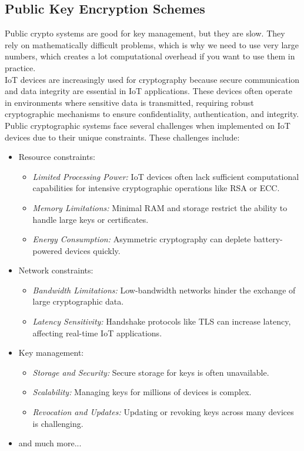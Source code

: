  \subsection{Public Key Encryption Schemes}
Public crypto systems are good for key management, but they are slow.
They rely on mathematically difficult problems, which is why we need to use very
large numbers, which creates a lot computational overhead if you want to use them in practice. \\

IoT devices are increasingly used for cryptography because secure communication and data integrity 
are essential in IoT applications.
These devices often operate in environments where sensitive data is transmitted, requiring robust cryptographic mechanisms to ensure confidentiality, authentication, and integrity.
Public cryptographic systems face several challenges when implemented on IoT devices due to their unique constraints. These challenges include:
\begin{itemize}
    \item Resource constraints:
    \begin{itemize}
        \item \textit{Limited Processing Power:} IoT devices often lack sufficient computational capabilities for intensive cryptographic operations like RSA or ECC.
        \item \textit{Memory Limitations:} Minimal RAM and storage restrict the ability to handle large keys or certificates.
        \item \textit{Energy Consumption:} Asymmetric cryptography can deplete battery-powered devices quickly.
    \end{itemize}

    \item Network constraints:
    \begin{itemize}
        \item \textit{Bandwidth Limitations:} Low-bandwidth networks hinder the exchange of large cryptographic data.
        \item \textit{Latency Sensitivity:} Handshake protocols like TLS can increase latency, affecting real-time IoT applications.
    \end{itemize}

    \item Key management:
    \begin{itemize}
        \item \textit{Storage and Security:} Secure storage for keys is often unavailable.
        \item \textit{Scalability:} Managing keys for millions of devices is complex.
        \item \textit{Revocation and Updates:} Updating or revoking keys across many devices is challenging.
    \end{itemize}
    \item and much more...
\end{itemize}

